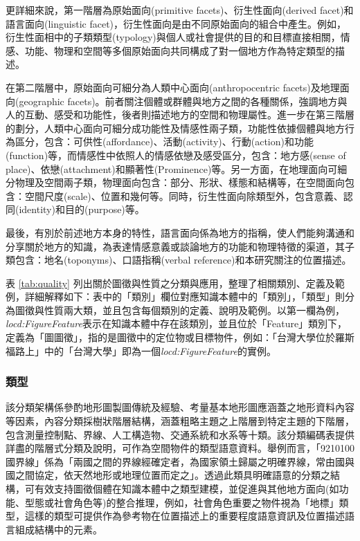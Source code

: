 更詳細來說，第一階層為原始面向(primitive facets)、衍生性面向(derived facet)和語言面向(linguistic facet)，衍生性面向是由不同原始面向的組合中產生。例如，衍生性面相中的子類類型(typology)與個人或社會提供的目的和目標直接相關，情感、功能、物理和空間等多個原始面向共同構成了對一個地方作為特定類型的描述。

在第二階層中，原始面向可細分為人類中心面向(anthropocentric facets)及地理面向(geographic facets)。前者關注個體或群體與地方之間的各種關係，強調地方與人的互動、感受和功能性，後者則描述地方的空間和物理屬性。進一步在第三階層的劃分，人類中心面向可細分成功能性及情感性兩子類，功能性依據個體與地方行為區分，包含：可供性(affordance)、活動(activity)、行動(action)和功能(function)等，而情感性中依照人的情感依戀及感受區分，包含：地方感(sense of place)、依戀(attachment)和顯著性(Prominence)等。另一方面，在地理面向可細分物理及空間兩子類，物理面向包含：部分、形狀、樣態和結構等，在空間面向包含：空間尺度(scale)、位置和幾何等。同時，衍生性面向除類型外，包含意義、認同(identity)和目的(purpose)等。

最後，有別於前述地方本身的特性，語言面向係為地方的指稱，使人們能夠溝通和分享關於地方的知識，為表達情感意義或談論地方的功能和物理特徵的渠道，其子類包含：地名(toponyms)、口語指稱(verbal reference)和本研究關注的位置描述。

表 \ref{tab:quality} 列出關於圖徵與性質之分類與應用，整理了相關類別、定義及範例，詳細解釋如下：表中的「類別」欄位對應知識本體中的「類別」，「類型」則分為圖徵與性質兩大類，並且包含每個類別的定義、說明及範例。以第一欄為例，\textit{locd:FigureFeature}表示在知識本體中存在該類別，並且位於「Feature」類別下，定義為「圖圖徵」，指的是圖徵中的定位物或目標物件，例如：「台灣大學位於羅斯福路上」中的「台灣大學」即為一個\textit{locd:FigureFeature}的實例。



\subsubsection{類型}


該分類架構係參酌地形圖製圖傳統及經驗、考量基本地形圖應涵蓋之地形資料內容等因素，內容分類採樹狀階層結構，涵蓋粗略主題之上階層到特定主題的下階層，包含測量控制點、界線、人工構造物、交通系統和水系等十類。該分類編碼表提供詳盡的階層式分類及說明，可作為空間物件的類型語意資料。舉例而言，「9210100國界線」係為「兩國之間的界線經確定者，為國家領土歸屬之明確界線，常由國與國之間協定，依天然地形或地理位置而定之」。透過此類具明確語意的分類之結構，可有效支持圖徵個體在知識本體中之類型建模，並促進與其他地方面向(如功能、型態或社會角色等)的整合推理，例如，社會角色重要之物件視為「地標」類型，這樣的類型可提供作為參考物在位置描述上的重要程度語意資訊及位置描述語言組成結構中的元素。

